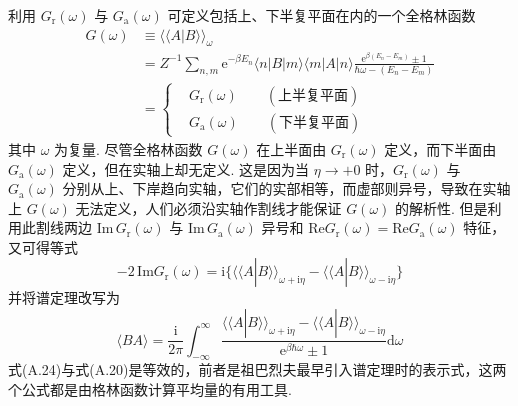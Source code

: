 利用 $G_{\mathrm{r}}(\omega)$ 与 $G_{\mathrm{a}}(\omega)$ 可定义包括上、下半复平面在内的一个全格林函数
\begin{equation}
\begin{aligned}
G(\omega)&\equiv\langle\langle A|B\rangle\rangle_{\omega}\\
&=Z^{-1}\sum_{n,m}\mathrm{e}^{-\beta E_{n}}\langle n|B|m\rangle
\langle m|A|n\rangle
\frac{\mathrm{e}^{\beta(E_{n}-E_{m})}\pm1}
{\hbar\omega-(E_{n}-E_{m})}\\
&=\left\{
\begin{aligned}
&G_{\mathrm{r}}(\omega)\qquad(\text{上半复平面})\\
&G_{\mathrm{a}}(\omega)\qquad(\text{下半复平面})
\end{aligned}\right.
\end{aligned}
\end{equation}
其中 $\omega$ 为复量. 尽管全格林函数 $G(\omega)$ 在上半面由 $G_{\mathrm{r}}(\omega)$ 定义，而下半面由 $G_{\mathrm{a}}(\omega)$ 定义，但在实轴上却无定义. 这是因为当 $\eta\to+0$ 时，$G_{\mathrm{r}}(\omega)$ 与 $G_{\mathrm{a}}(\omega)$ 分别从上、下岸趋向实轴，它们的实部相等，而虚部则异号，导致在实轴上 $G(\omega)$ 无法定义，人们必须沿实轴作割线才能保证 $G(\omega)$ 的解析性. 但是利用此割线两边 $\mathrm{Im}\,G_{\mathrm{r}}(\omega)$ 与 $\mathrm{Im}\,G_{\mathrm{a}}(\omega)$ 异号和 $\mathrm{Re}G_{\mathrm{r}}(\omega)=\mathrm{Re}G_{\mathrm{a}}(\omega)$ 特征，又可得等式
\begin{equation*}
-2\,\mathrm{Im}G_{\mathrm{r}}(\omega)=\mathrm{i}\bigl\{
\langle\langle A|B\rangle\rangle_{\omega+\mathrm{i}\eta}
-\langle\langle A|B\rangle\rangle_{\omega-\mathrm{i}\eta}\bigr\}
\end{equation*}
并将谱定理改写为
\begin{equation}
\langle BA\rangle=\frac{\mathrm{i}}{2\pi}\int_{-\infty}^{\infty}
\frac{\langle\langle A|B\rangle\rangle_{\omega+\mathrm{i}\eta}
-\langle\langle A|B\rangle\rangle_{\omega-\mathrm{i}\eta}}
{\mathrm{e}^{\beta\hbar\omega}\pm1}\mathrm{d}\omega
\end{equation}
式(A.24)与式(A.20)是等效的，前者是祖巴烈夫最早引入谱定理时的表示式，这两个公式都是由格林函数计算平均量的有用工具.

